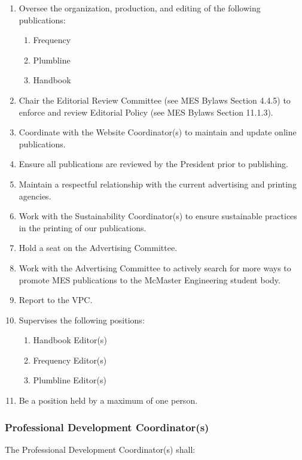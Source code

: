\begin{enumerate}
 \item
  Oversee the organization, production, and editing of the following publications:

  \begin{enumerate}
   \item
    Frequency
   \item
    Plumbline
   \item
    Handbook
  \end{enumerate}
 \item
  Chair the Editorial Review Committee (see MES Bylaws Section 4.4.5) to enforce and review Editorial Policy (see MES Bylaws Section 11.1.3).
 \item
  Coordinate with the Website Coordinator(s) to maintain and update online publications.
 \item
  Ensure all publications are reviewed by the President prior to publishing.
 \item
  Maintain a respectful relationship with the current advertising and printing agencies. 
 \item   
  Work with the Sustainability Coordinator(s) to ensure sustainable practices in the printing of our publications.
 \item
  Hold a seat on the Advertising Committee.
 \item
  Work with the Advertising Committee to actively search for more ways to promote MES publications to the McMaster Engineering student body.
 \item
  Report to the VPC.
 \item
  Supervises the following positions:

  \begin{enumerate}
   \item
    Handbook Editor(s)
   \item
    Frequency Editor(s)
   \item
    Plumbline Editor(s)
  \end{enumerate}
 \item
  Be a position held by a maximum of one person.

\end{enumerate}

\subsubsection{Professional Development Coordinator(s)}
\label{professional-development-coordinators}
The Professional Development Coordinator(s) shall:

